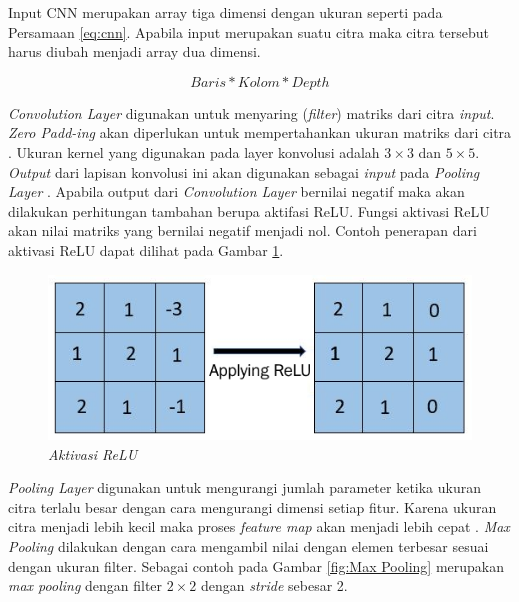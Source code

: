 Input CNN merupakan array tiga dimensi dengan ukuran seperti pada Persamaan \ref{eq:cnn}. Apabila input merupakan suatu citra maka citra tersebut harus diubah menjadi array dua dimensi. 

\begin{equation}
  \label{eq:cnn}
Baris * Kolom * Depth
\end{equation}

\emph{Convolution Layer} digunakan untuk menyaring (\emph{filter}) matriks dari citra \emph{input}. \emph{Zero Padd-ing} akan diperlukan untuk mempertahankan ukuran matriks dari citra \parencite{dwitama2019klasifikasi}. Ukuran kernel yang digunakan pada layer konvolusi adalah \(3 \times 3\) dan \(5 \times 5\). \emph{Output} dari lapisan konvolusi ini akan digunakan sebagai \emph{input} pada \emph{Pooling Layer} \parencite{hakim2018}. Apabila output dari \emph{Convolution Layer} bernilai negatif maka akan dilakukan perhitungan tambahan berupa aktifasi ReLU. Fungsi aktivasi ReLU akan nilai matriks yang bernilai negatif menjadi nol. Contoh penerapan dari aktivasi ReLU dapat dilihat pada Gambar \ref{fig:Aktivasi ReLU}.

\begin{figure} [ht] \centering
    \includegraphics[scale=1]{gambar/aktivasiReLU.png}
    \caption{\emph{Aktivasi ReLU}}
    \label{fig:Aktivasi ReLU}
\end{figure}

\emph{Pooling Layer} digunakan untuk mengurangi jumlah parameter ketika ukuran citra terlalu besar dengan cara mengurangi dimensi setiap fitur. Karena ukuran citra menjadi lebih kecil maka proses \emph{feature map} akan menjadi lebih cepat \parencite{hakim2018}. \emph{Max Pooling} dilakukan dengan cara mengambil nilai dengan elemen terbesar sesuai dengan ukuran filter. Sebagai contoh pada Gambar \ref{fig:Max Pooling} merupakan \emph{max pooling} dengan filter \(2 \times 2\) dengan \emph{stride} sebesar 2.


